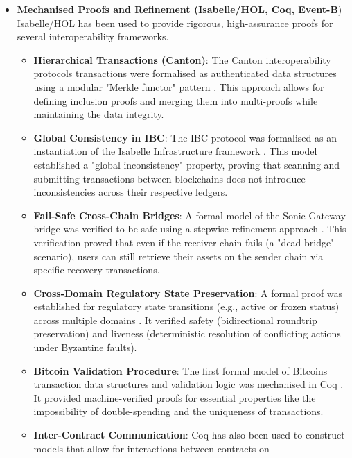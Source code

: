 \begin{itemize}
\tightlist
\item
  \textbf{Mechanised Proofs and Refinement (Isabelle/HOL, Coq, Event-B})
  Isabelle/HOL has been used to provide rigorous, high-assurance proofs
  for several interoperability frameworks.

  \begin{itemize}
  \tightlist
  \item
    \textbf{Hierarchical Transactions (Canton)}: The Canton
    interoperability protocol\textquotesingle s transactions were
    formalised as authenticated data structures using a modular "Merkle
    functor" pattern \citep{lochbihler2020}. This approach allows for
    defining inclusion proofs and merging them into multi-proofs while
    maintaining the data integrity.
  \item
    \textbf{Global Consistency in IBC}: The IBC protocol was formalised
    as an instantiation of the Isabelle Infrastructure framework
    \citep{kammuller2020}. This model established a "global
    inconsistency" property, proving that scanning and submitting
    transactions between blockchains does not introduce inconsistencies
    across their respective ledgers.
  \item
    \textbf{Fail-Safe Cross-Chain Bridges}: A formal model of the Sonic
    Gateway bridge was verified to be safe using a stepwise refinement
    approach \citep{maric2025}. This verification proved that even if
    the receiver chain fails (a "dead bridge" scenario), users can still
    retrieve their assets on the sender chain via specific recovery
    transactions.
  \item
    \textbf{Cross-Domain Regulatory State Preservation}: A formal proof
    was established for regulatory state transitions (e.g., active or
    frozen status) across multiple domains \citep{kim2026}. It verified
    safety (bidirectional roundtrip preservation) and liveness
    (deterministic resolution of conflicting actions under Byzantine
    faults).
  \item
    \textbf{Bitcoin Validation Procedure}: The first formal model of
    Bitcoin\textquotesingle s transaction data structures and validation
    logic was mechanised in Coq \citep{rupic2020}. It provided
    machine-verified proofs for essential properties like the
    impossibility of double-spending and the uniqueness of transactions.
  \item
    \textbf{Inter-Contract Communication}: Coq has also been used to
    construct models that allow for interactions between contracts on

\end{itemize}
\end{itemize}
